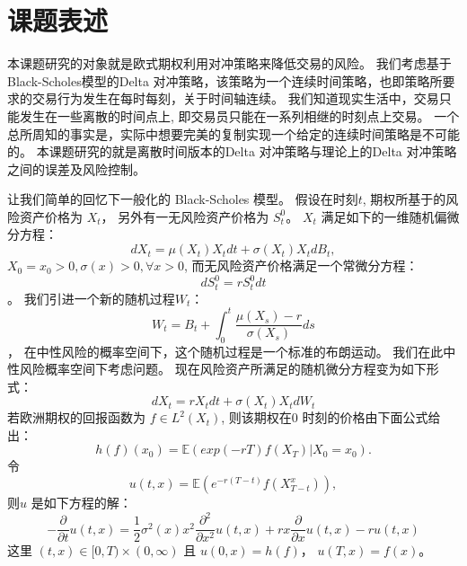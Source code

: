 
\section{课题表述} %
\label{sec:subject}

本课题研究的对象就是欧式期权利用对冲策略来降低交易的风险。
我们考虑基于Black-Scholes模型的Delta 对冲策略，该策略为一个连续时间策略，也即策略所要求的交易行为发生在每时每刻，关于时间轴连续。
我们知道现实生活中，交易只能发生在一些离散的时间点上, 即交易员只能在一系列相继的时刻点上交易。
一个总所周知的事实是，实际中想要完美的复制实现一个给定的连续时间策略是不可能的。
本课题研究的就是离散时间版本的Delta 对冲策略与理论上的Delta 对冲策略之间的误差及风险控制。

让我们简单的回忆下一般化的 Black-Scholes 模型。 假设在时刻$t$, 期权所基于的风险资产价格为 $X_t$， 另外有一无风险资产价格为 $S_t^0$。
$X_t$ 满足如下的一维随机偏微分方程：
\begin{equation}
dX_t=\mu(X_t)X_tdt+\sigma(X_t)X_tdB_t,
\end{equation}
$X_0=x_0>0, \sigma(x)>0, \forall x>0$,
而无风险资产价格满足一个常微分方程：
\begin{equation}
dS_t^0=rS^0_tdt
\end{equation}。
我们引进一个新的随机过程$W_t$：
\begin{equation}
W_t=B_t+\int^t_0\frac{\mu(X_s)-r}{\sigma(X_s)}ds
\end{equation}，
在中性风险的概率空间下，这个随机过程是一个标准的布朗运动。 我们在此中性风险概率空间下考虑问题。
现在风险资产所满足的随机微分方程变为如下形式：
\begin{equation}
dX_t=rX_tdt+\sigma(X_t)X_tdW_t
\end{equation}
若欧洲期权的回报函数为 $f\in L^2(X_t)$, 则该期权在0 时刻的价格由下面公式给出：
\begin{equation}
h(f)(x_0)=\mathbb{E}(exp(-rT)f(X_T)|X_0=x_0).
\end{equation}
令
\begin{equation}
u(t, x)=\mathbb{E}(e^{-r(T-t)}f(X_{T-t}^x)),
\end{equation}
则$u$ 是如下方程的解：
\begin{equation}
-\frac{\partial}{\partial t}u(t, x) =\frac{1}{2}\sigma^2(x)x^2\frac{\partial^2}{\partial x^2}u(t,x)+rx\frac{\partial}{\partial x}u(t,x)-ru(t,x)
\end{equation}
这里 $(t,x)\in [0,T)\times (0,\infty)$ 且 $u(0,x)=h(f)$，  $u(T,x)=f(x)$。

